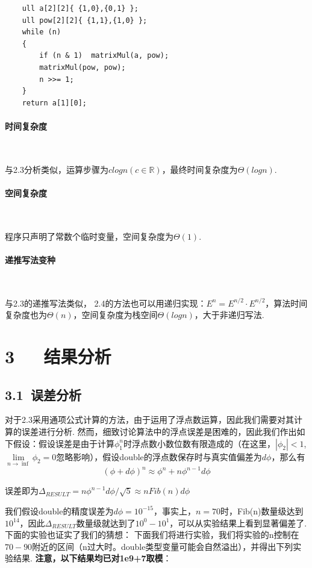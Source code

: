 \documentclass[UTF8]{ctexart}
\begin{document}
\begin{lstlisting}
	ull a[2][2]{ {1,0},{0,1} };
	ull pow[2][2]{ {1,1},{1,0} };
	while (n)
	{
		if (n & 1)	matrixMul(a, pow);
		matrixMul(pow, pow);
		n >>= 1;
	}
	return a[1][0];
\end{lstlisting}

\paragraph{时间复杂度}\ \par
与2.3分析类似，运算步骤为$clogn(c\in \mathbb{R})$，最终时间复杂度为$\Theta(logn)$.\\

\paragraph{空间复杂度}\ \par
程序只声明了常数个临时变量，空间复杂度为$\Theta(1)$.
\paragraph{递推写法变种}\ \par
与2.3的递推写法类似，
2.4的方法也可以用递归实现：$E^n=E^{n/2}\cdot E^{n/2}$，算法时间复杂度也为$\Theta(n)$，空间复杂度为栈空间$\Theta(logn)$，大于非递归写法.

\section*{3\ \ \ 结果分析}
\subsection*{3.1\ 误差分析}
对于2.3采用通项公式计算的方法，由于运用了浮点数运算，因此我们需要对其计算的误差进行分析. 然而，细致讨论算法中的浮点误差是困难的，因此我们作出如下假设：假设误差是由于计算$\phi_1^n$时浮点数小数位数有限造成的（在这里，$|\phi_2|<1$,$\lim\limits_{n\rightarrow \inf}\phi_2=0$忽略影响），假设double的浮点数保存时与真实值偏差为$d\phi$，那么有
$$(\phi+d\phi)^n\approx \phi^n + n\phi^{n-1}d\phi$$\par
误差即为$\Delta _{RESULT} = n\phi^{n-1}d\phi/\sqrt{5}\approx n Fib(n) d\phi$\par
我们假设double的精度误差为$d\phi = 10^{-15}$，事实上，$n=70$时，Fib(n)数量级达到$10^{14}$，因此$\Delta _{RESULT}$数量级就达到了$10^0-10^1$，可以从实验结果上看到显著偏差了. 下面的实验也证实了我们的猜想：
下面我们将进行实验，我们将实验的n控制在$70-90$附近的区间（n过大时。double类型变量可能会自然溢出），并得出下列实验结果. \textbf{注意，以下结果均已对1e9+7取模}：
\end{document}
